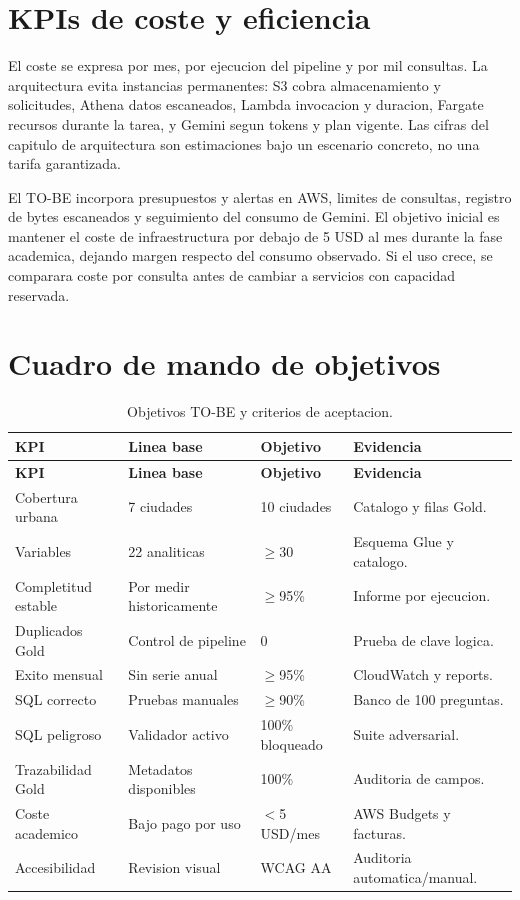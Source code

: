 \section{KPIs de coste y eficiencia}

El coste se expresa por mes, por ejecucion del pipeline y por mil consultas. La arquitectura evita instancias permanentes: S3 cobra almacenamiento y solicitudes, Athena datos escaneados, Lambda invocacion y duracion, Fargate recursos durante la tarea, y Gemini segun tokens y plan vigente. Las cifras del capitulo de arquitectura son estimaciones bajo un escenario concreto, no una tarifa garantizada.

El TO-BE incorpora presupuestos y alertas en AWS, limites de consultas, registro de bytes escaneados y seguimiento del consumo de Gemini. El objetivo inicial es mantener el coste de infraestructura por debajo de 5 USD al mes durante la fase academica, dejando margen respecto del consumo observado. Si el uso crece, se comparara coste por consulta antes de cambiar a servicios con capacidad reservada.

\section{Cuadro de mando de objetivos}

\begin{longtable}{p{}p{}p{}p{}}
\caption{Objetivos TO-BE y criterios de aceptacion.}\label{tab:objetivos-tobe}\\
\toprule
\textbf{KPI} & \textbf{Linea base} & \textbf{Objetivo} & \textbf{Evidencia} \\
\midrule
\endfirsthead
\toprule
\textbf{KPI} & \textbf{Linea base} & \textbf{Objetivo} & \textbf{Evidencia} \\
\midrule
\endhead
Cobertura urbana & 7 ciudades & 10 ciudades & Catalogo y filas Gold. \\
Variables & 22 analiticas & $\geq$30 & Esquema Glue y catalogo. \\
Completitud estable & Por medir historicamente & $\geq$95\% & Informe por ejecucion. \\
Duplicados Gold & Control de pipeline & 0 & Prueba de clave logica. \\
Exito mensual & Sin serie anual & $\geq$95\% & CloudWatch y reports. \\
SQL correcto & Pruebas manuales & $\geq$90\% & Banco de 100 preguntas. \\
SQL peligroso & Validador activo & 100\% bloqueado & Suite adversarial. \\
Trazabilidad Gold & Metadatos disponibles & 100\% & Auditoria de campos. \\
Coste academico & Bajo pago por uso & $<$5 USD/mes & AWS Budgets y facturas. \\
Accesibilidad & Revision visual & WCAG AA & Auditoria automatica/manual. \\
\bottomrule
\end{longtable}


